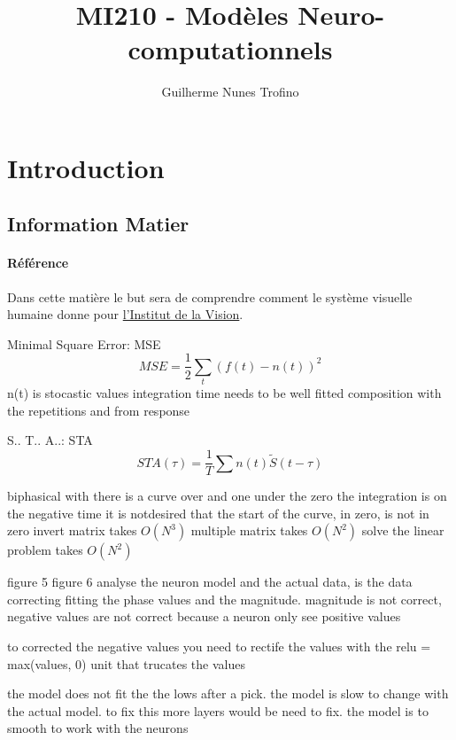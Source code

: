 \documentclass{article}
\title{MI210 - Modèles Neuro-computationnels}
\author{Guilherme Nunes Trofino}
\begin{document}
\maketitle
\setlength{\parindent}{0pt}

\newpage\tableofcontents

\section{Introduction}


\subsection{Information Matier}
\paragraph{Référence}Dans cette matière le but sera de comprendre comment le système visuelle humaine donne pour \href{http://oliviermarre.free.fr/index.php/teaching/}{l'Institut de la Vision}.

Minimal Square Error: MSE
\begin{equation}
    MSE = \frac{1}{2} \sum_{t}(f(t) - n(t))^2
\end{equation}
n(t) is stocastic values
integration time needs to be well fitted
composition with the repetitions and from response

S.. T.. A..: STA
\begin{equation}
    STA(\tau) = \frac{1}{T} \sum n(t) \tilde{S}(t -\tau)
\end{equation}

biphasical with there is a curve over and one under the zero
the integration is on the negative time
it is notdesired that the start of the curve, in zero, is not in zero
invert matrix takes $O(N^3)$
multiple matrix takes $O(N^2)$
solve the linear problem takes $O(N^2)$


figure 5 figure 6
analyse the neuron model and the actual data, is the data correcting fitting the phase values and the magnitude. magnitude is not correct, negative values are not correct because a neuron only see positive values

to corrected the negative values you need to rectife the values with the relu = max(values, 0) unit that trucates the values

the model does not fit the the lows after a pick. the model is slow to change with the actual model. to fix this more layers would be need to fix. the model is to smooth to work with the neurons
\end{document}
